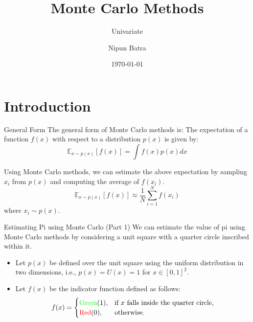 \documentclass[handout]{beamer}
\begin{document}
\title{Monte Carlo Methods}
\subtitle{Univariate}
\author{Nipun Batra}
\date{\today}
\maketitle

\section{Introduction}

\begin{frame}{General Form}
The general form of Monte Carlo methods is:
The expectation of a function $f(x)$ with respect to a distribution $p(x)$ is given by:
\begin{equation}
    \mathbb{E}_{x \sim p(x)}[f(x)] = \int f(x) p(x) dx
\end{equation}

Using Monte Carlo methods, we can estimate the above expectation by sampling $x_i$ from $p(x)$ and computing the average of $f(x_i)$.
\begin{equation}
    \mathbb{E}_{x \sim p(x)}[f(x)] \approx \frac{1}{N} \sum_{i=1}^{N} f(x_i)
\end{equation}
where $x_i \sim p(x)$.
\end{frame}
\begin{frame}[fragile]{Estimating Pi using Monte Carlo (Part 1)}
    We can estimate the value of pi using Monte Carlo methods by considering a unit square with a quarter circle inscribed within it.
    
    \begin{itemize}
        \item Let $p(x)$ be defined over the unit square using the uniform distribution in two dimensions, i.e., $p(x) = U(x) = 1$ for $x \in [0, 1]^2$.
        \item Let $f(x)$ be the indicator function defined as follows:
            \[
            f(x) = \begin{cases}
                        \text{\textcolor{green}{Green}} (1), & \text{if } x \text{ falls inside the quarter circle}, \\
                        \text{\textcolor{red}{Red}} (0), & \text{otherwise}.
                   \end{cases}
            \]
    \end{itemize}
\end{frame}
    
\end{document}
